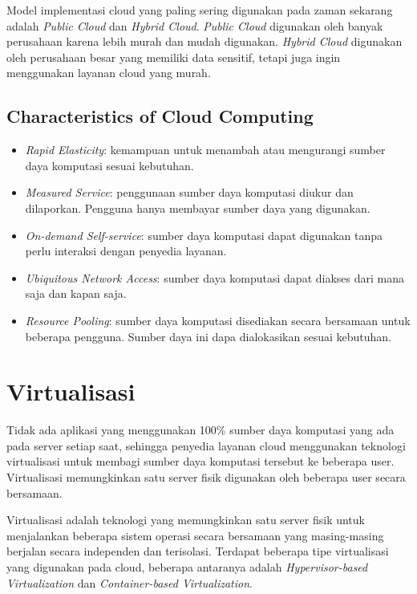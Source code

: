 \documentclass[conference]{IEEEtran}
\begin{document}
Model implementasi cloud yang paling sering digunakan pada zaman sekarang adalah \textit{Public Cloud} dan \textit{Hybrid Cloud}. \textit{Public Cloud} digunakan oleh banyak perusahaan karena lebih murah dan mudah digunakan. \textit{Hybrid Cloud} digunakan oleh perusahaan besar yang memiliki data sensitif, tetapi juga ingin menggunakan layanan cloud yang murah.

\subsection{Characteristics of Cloud Computing}

\begin{itemize}
    \item \textit{Rapid Elasticity}: kemampuan untuk menambah atau mengurangi sumber daya komputasi sesuai kebutuhan.
    \item \textit{Measured Service}: penggunaan sumber daya komputasi diukur dan dilaporkan. Pengguna hanya membayar sumber daya yang digunakan.
    \item \textit{On-demand Self-service}: sumber daya komputasi dapat digunakan tanpa perlu interaksi dengan penyedia layanan.
    \item \textit{Ubiquitous Network Access}: sumber daya komputasi dapat diakses dari mana saja dan kapan saja.
    \item \textit{Resource Pooling}: sumber daya komputasi disediakan secara bersamaan untuk beberapa pengguna. Sumber daya ini dapa dialokasikan sesuai kebutuhan.
\end{itemize}

\section{Virtualisasi}

Tidak ada aplikasi yang menggunakan 100\% sumber daya komputasi yang ada pada server setiap saat, sehingga penyedia layanan cloud menggunakan teknologi virtualisasi untuk membagi sumber daya komputasi tersebut ke beberapa user. Virtualisasi memungkinkan satu server fisik digunakan oleh beberapa user secara bersamaan.

Virtualisasi adalah teknologi yang memungkinkan satu server fisik untuk menjalankan beberapa sistem operasi secara bersamaan yang masing-masing berjalan secara independen dan terisolasi. Terdapat beberapa tipe virtualisasi yang digunakan pada cloud, beberapa antaranya adalah \textit{Hypervisor-based Virtualization} dan \textit{Container-based Virtualization}.
\end{document}
